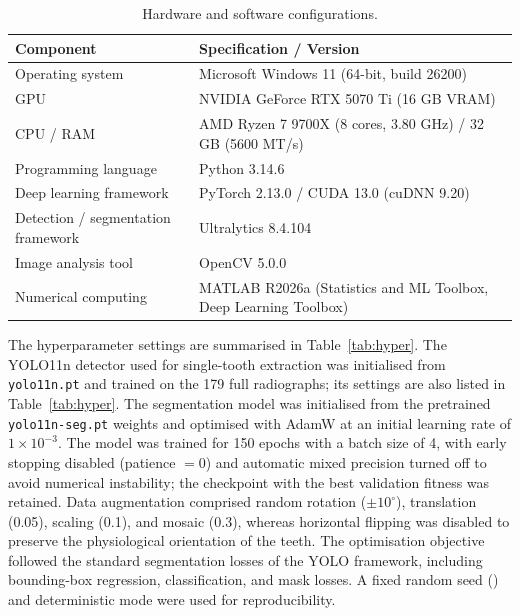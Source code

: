 \begin{table}[t]
\centering
\caption{Hardware and software configurations.}
\label{tab:hw}
\small
\begin{tabular}{@{}p{}p{}@{}}
\toprule
Component & Specification / Version \\
\midrule
Operating system & Microsoft Windows 11 (64-bit, build 26200) \\
GPU & NVIDIA GeForce RTX 5070 Ti (16 GB VRAM) \\
CPU / RAM & AMD Ryzen 7 9700X (8 cores, 3.80 GHz) / 32 GB (5600 MT/s) \\
Programming language & Python 3.14.6 \\
Deep learning framework & PyTorch 2.13.0 / CUDA 13.0 (cuDNN 9.20) \\
Detection / segmentation framework & Ultralytics 8.4.104 \\
Image analysis tool & OpenCV 5.0.0 \\
Numerical computing & MATLAB R2026a (Statistics and ML Toolbox, Deep Learning Toolbox) \\
\bottomrule
\end{tabular}
\end{table}


The hyperparameter settings are summarised in Table~\ref{tab:hyper}. The YOLO11n detector used for single-tooth extraction was initialised from \texttt{yolo11n.pt} and trained on the 179 full radiographs; its settings are also listed in Table~\ref{tab:hyper}. The
segmentation model was initialised from the pretrained \texttt{yolo11n-seg.pt}
weights and optimised with AdamW at an initial learning rate of
$1\times10^{-3}$. The model was trained for 150 epochs with a batch size of 4,
with early stopping disabled (patience $=0$) and automatic mixed precision
turned off to avoid numerical instability; the checkpoint with the best
validation fitness was retained. Data augmentation comprised random rotation
($\pm10^\circ$), translation (0.05), scaling (0.1), and mosaic (0.3), whereas
horizontal flipping was disabled to preserve the physiological orientation of
the teeth. The optimisation objective followed the standard segmentation losses
of the YOLO framework, including bounding-box regression, classification, and
mask losses. A fixed random seed (\tbd{}) and deterministic mode were used for reproducibility.

